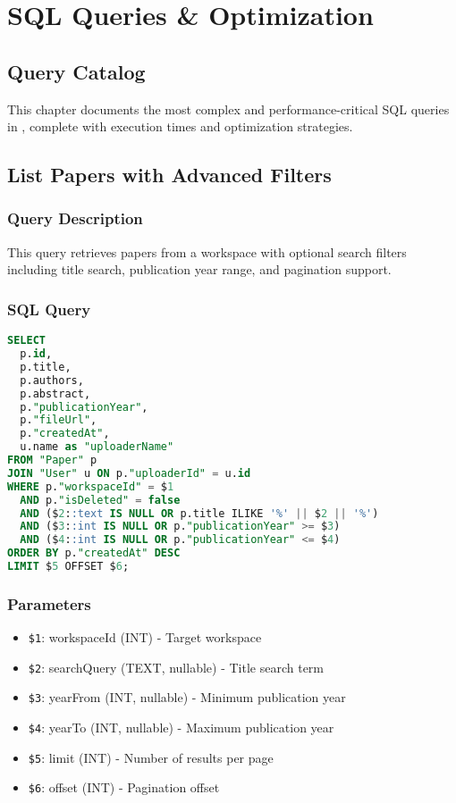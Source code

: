 \chapter{SQL Queries \& Optimization}
\label{ch:sql-queries}

\section{Query Catalog}
\label{sec:query-catalog}

This chapter documents the most complex and performance-critical SQL queries in \projectname{}, complete with execution times and optimization strategies.

\section{List Papers with Advanced Filters}
\label{sec:query-list-papers}

\subsection{Query Description}
This query retrieves papers from a workspace with optional search filters including title search, publication year range, and pagination support.

\subsection{SQL Query}
\begin{lstlisting}[language=SQL, caption={List Papers with Pagination and Filters}]
SELECT 
  p.id,
  p.title,
  p.authors,
  p.abstract,
  p."publicationYear",
  p."fileUrl",
  p."createdAt",
  u.name as "uploaderName"
FROM "Paper" p
JOIN "User" u ON p."uploaderId" = u.id
WHERE p."workspaceId" = $1
  AND p."isDeleted" = false
  AND ($2::text IS NULL OR p.title ILIKE '%' || $2 || '%')
  AND ($3::int IS NULL OR p."publicationYear" >= $3)
  AND ($4::int IS NULL OR p."publicationYear" <= $4)
ORDER BY p."createdAt" DESC
LIMIT $5 OFFSET $6;
\end{lstlisting}

\subsection{Parameters}
\begin{itemize}[leftmargin=*,topsep=3pt,itemsep=2pt]
    \item \texttt{\$1}: workspaceId (INT) - Target workspace
    \item \texttt{\$2}: searchQuery (TEXT, nullable) - Title search term
    \item \texttt{\$3}: yearFrom (INT, nullable) - Minimum publication year
    \item \texttt{\$4}: yearTo (INT, nullable) - Maximum publication year
    \item \texttt{\$5}: limit (INT) - Number of results per page
    \item \texttt{\$6}: offset (INT) - Pagination offset
\end{itemize}

